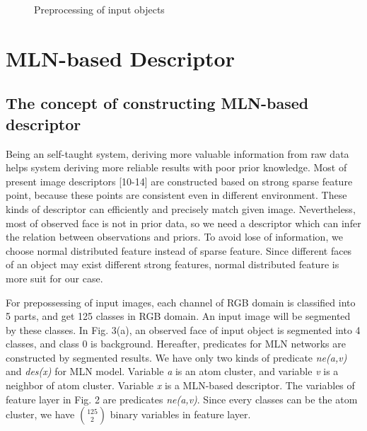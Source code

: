 \documentclass[journal]{IEEEtran}
\begin{document}
\begin{figure}[!t]
\begin{center}
\caption{Preprocessing of input objects}\label{test}
\end{center}
\end{figure}


\section{MLN-based Descriptor}
\subsection{The concept of constructing MLN-based descriptor}
Being an self-taught system, deriving more valuable information from raw data helps system deriving more reliable results with poor prior knowledge. Most of present image descriptors [10-14] are constructed based on strong sparse feature point, because these points are consistent even in different environment. These kinds of descriptor can efficiently and precisely match given image. Nevertheless, most of observed face is not in prior data, so we need a descriptor which can infer the relation between observations and priors. To avoid lose of information, we choose normal distributed feature instead of sparse feature. Since different faces of an object may exist different strong features, normal distributed feature is more suit for our case. 

For prepossessing of input images, each channel of RGB domain is classified into 5 parts, and get 125 classes in RGB domain. An input image will be segmented by these classes. In Fig. 3(a), an observed face of input object is segmented into 4 classes, and class 0 is background. Hereafter, predicates for MLN networks are constructed by segmented results. We have only two kinds of predicate \textit{ne(a,v)} and  \textit{des(x)} for MLN model. Variable \textit{a} is an atom cluster, and variable \textit{v} is a neighbor of atom cluster. Variable \textit{x} is a MLN-based descriptor. The variables of feature layer in Fig. 2 are predicates \textit{ne(a,v)}. Since every classes can be the atom cluster, we have $\binom{125}{2}$ binary variables in feature layer.
\end{document}
